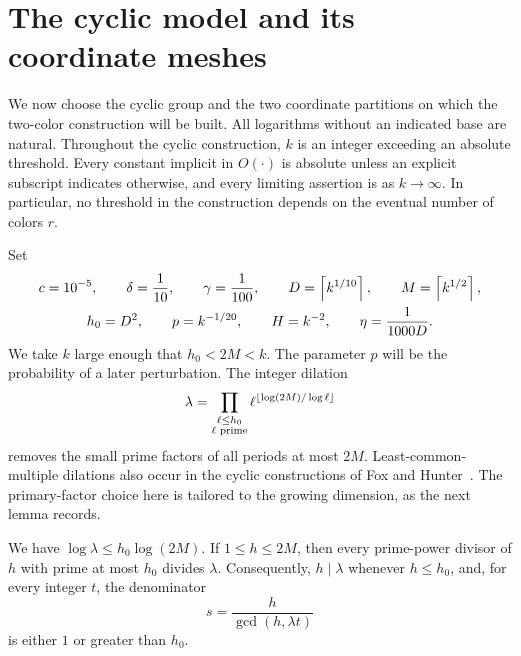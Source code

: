 \section{The cyclic model and its coordinate meshes}\label{sec:setup}

We now choose the cyclic group and the two coordinate partitions on
which the two-color construction will be built.
All logarithms without an indicated base are natural. Throughout the cyclic
construction, $k$ is an integer exceeding an absolute threshold. Every
constant implicit in $O(\cdot)$ is absolute unless an explicit subscript
indicates otherwise, and every limiting assertion is as $k\to\infty$.
In particular, no threshold in the construction depends on the eventual
number of colors $r$.

Set
\begin{equation}\label{setup:parameters}
\begin{gathered}
 c=10^{-5},\qquad \delta=\frac1{10},\qquad \gamma=\frac1{100},\qquad
 D=\left\lceil k^{1/10}\right\rceil,\qquad M=\left\lceil k^{1/2}\right\rceil,\\
 h_0=D^2,\qquad p=k^{-1/20},\qquad H=k^{-2},\qquad
 \eta=\frac1{1000D}.
\end{gathered}
\end{equation}
We take $k$ large enough that $h_0<2M<k$.
The parameter $p$ will be the probability of a later perturbation. The
integer dilation
\begin{equation}\label{setup:dilation-definition}
 \lambda=\prod_{\substack{\ell\le h_0\\ \ell\text{ prime}}}
 \ell^{\left\lfloor\log(2M)/\log\ell\right\rfloor}
\end{equation}
removes the small prime factors of all periods at most $2M$.
Least-common-multiple dilations also occur in the cyclic constructions
of Fox and Hunter~\cite{foxHunter2026}. The primary-factor choice here
is tailored to the growing dimension, as the next lemma records.

\begin{lemma}\label{setup:dilation}
We have $\log\lambda\le h_0\log(2M)$. If $1\le h\le2M$, then
every prime-power divisor of $h$ with prime at most $h_0$ divides
$\lambda$. Consequently, $h\mid\lambda$ whenever $h\le h_0$, and, for
every integer $t$, the denominator
\begin{equation}\label{setup:denominator}
 s=\frac{h}{\gcd(h,\lambda t)}
\end{equation}
is either $1$ or greater than $h_0$.
\end{lemma}

